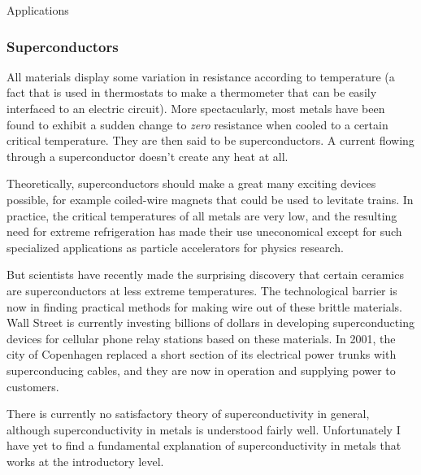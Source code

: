 \begin{envsubsection}{Applications}
\subsubsection{Superconductors}
All materials display some variation in resistance according
to temperature (a fact that is used in thermostats to make a
thermometer that can be easily interfaced to an electric
circuit). More spectacularly, most metals have been found to
exhibit a sudden change to \emph{zero} resistance when
cooled to a certain critical temperature. They are then said
to be superconductors. A current flowing through a superconductor
doesn't create any heat at all.

Theoretically, superconductors should
make a great many exciting devices possible, for example
coiled-wire magnets that could be used to levitate trains.
In practice, the critical temperatures of all metals are
very low, and the resulting need for extreme refrigeration
has made their use uneconomical except for such specialized
applications as particle accelerators for physics research.

But scientists have recently made the surprising discovery
that certain ceramics are superconductors at less extreme
temperatures. The technological barrier is now in finding
practical methods for making wire out of these brittle
materials. Wall Street is currently investing billions of
dollars in developing superconducting devices for cellular
phone relay stations based on these materials. In 2001, the
city of Copenhagen replaced a short section of its
electrical power trunks with superconducing cables, and they
are now in operation and supplying power to customers.

There is currently no satisfactory theory of superconductivity
in general, although superconductivity in metals is
understood fairly well. Unfortunately I have yet to find a
fundamental explanation of superconductivity in metals that
works at the introductory level.


\end{envsubsection}
